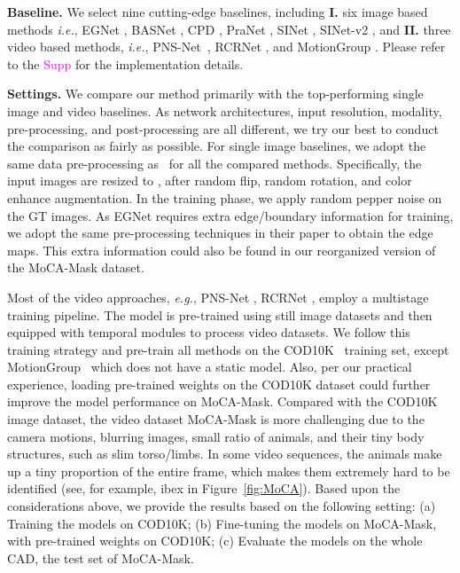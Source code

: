 \documentclass[10pt,twocolumn,letterpaper]{article}
\def\eg{\emph{e.g.}}
\def\ie{\emph{i.e.}}
\newcommand{\supp}[1]{\textcolor{magenta}{#1}}
\def\figref#1{Figure~\ref{#1}}
\begin{document}
\textbf{Baseline.}
We select nine cutting-edge baselines, including \textbf{I.} six image based methods \ie, EGNet \cite{zhao2019EGNet}, BASNet \cite{Qin_2019_CVPR} ,   {CPD} \cite{Wu_2019_CVPR}, {PraNet} \cite{fan2020pra}, {SINet} \cite{fan2020Camouflage}, {SINet-v2} \cite{fan2021concealed}, and \textbf{II.}  three video based methods, \ie, PNS-Net~\cite{ji2021progressively}, {RCRNet} \cite{yan2019semi}, and {MotionGroup} \cite{yang2021selfsupervised}. Please refer to the \supp{Supp} for the implementation details.

\textbf{Settings.}
We compare our method primarily with the top-performing single image and video baselines. As network architectures, input resolution, modality, pre-processing, and post-processing are all different, we try our best to conduct the comparison as fairly as possible. For single image baselines, we adopt the same data pre-processing as~\cite{fan2020Camouflage, fan2021concealed} for all the compared methods. Specifically, the input images are resized to , after random flip, random rotation, and color enhance augmentation. In the training phase, we apply random pepper noise on the GT images.
As EGNet \cite{zhao2019EGNet} requires extra edge/boundary information for training, we adopt the same pre-processing techniques in their paper to obtain the edge maps. This extra information could also be found in our reorganized version of the MoCA-Mask dataset. 


Most of the video approaches, \eg, PNS-Net \cite{ji2021progressively}, RCRNet \cite{yan2019semi}, employ a multistage training pipeline. The model is pre-trained using still image datasets and then equipped with temporal modules to process video datasets. We follow this training strategy and pre-train all methods on the COD10K~\cite{fan2021concealed} training set, except MotionGroup~\cite{yang2021selfsupervised} which does not have a static model. Also, per our practical experience, loading pre-trained weights on the COD10K dataset could further improve the model performance on MoCA-Mask. Compared with the COD10K image dataset, the video dataset MoCA-Mask is more challenging due to the camera motions, blurring images, small ratio of animals, and their tiny body structures, such as slim torso/limbs. In some video sequences, the animals make up a tiny proportion of the entire frame, which makes them extremely hard to be identified (see, for example, ibex in \figref{fig:MoCA}). Based upon the considerations above, we provide the results based on the following setting: (a) Training the models on COD10K; (b) Fine-tuning the models on MoCA-Mask, with pre-trained weights on COD10K; (c) Evaluate the models on the whole CAD, the test set of MoCA-Mask.
\end{document}
